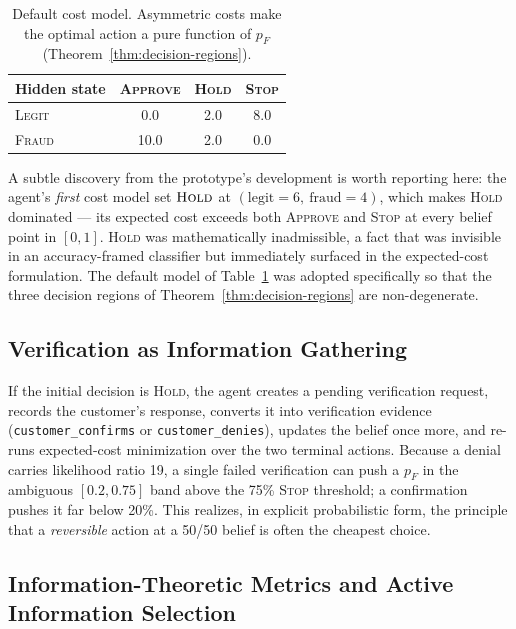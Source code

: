 \documentclass{article}
\begin{document}
\begin{table}[tb]
\centering
\footnotesize
\setlength{\tabcolsep}{4pt}
\begin{tabular}{lccc}
\toprule
Hidden state & \textsc{Approve} & \textsc{Hold} & \textsc{Stop} \\
\midrule
\textsc{Legit}  & 0.0 & 2.0 & 8.0 \\
\textsc{Fraud}  & 10.0 & 2.0 & 0.0 \\
\bottomrule
\end{tabular}
\caption{Default cost model. Asymmetric costs make the optimal action a pure
function of $p_F$ (Theorem~\ref{thm:decision-regions}).}
\label{tab:costs}
\end{table}

A subtle discovery from the prototype's development is worth reporting here:
the agent's \emph{first} cost model set $\textsc{Hold}$ at
$(\text{legit}=6,\ \text{fraud}=4)$, which makes \textsc{Hold} dominated --- its
expected cost exceeds both \textsc{Approve} and \textsc{Stop} at every belief
point in $[0,1]$. \textsc{Hold} was mathematically inadmissible, a fact that
was invisible in an accuracy-framed classifier but immediately surfaced in the
expected-cost formulation. The default model of Table~\ref{tab:costs} was
adopted specifically so that the three decision regions of
Theorem~\ref{thm:decision-regions} are non-degenerate.

\subsection{Verification as Information Gathering}

If the initial decision is \textsc{Hold}, the agent creates a pending
verification request, records the customer's response, converts it into
verification evidence (\texttt{customer\_confirms} or \texttt{customer\_denies}),
updates the belief once more, and re-runs expected-cost minimization over the
two terminal actions. Because a denial carries likelihood ratio 19, a single
failed verification can push a $p_F$ in the ambiguous $[0.2, 0.75]$ band above
the 75\% \textsc{Stop} threshold; a confirmation pushes it far below 20\%.
This realizes, in explicit probabilistic form, the principle that a
\emph{reversible} action at a 50/50 belief is often the cheapest choice.

\subsection{Information-Theoretic Metrics and Active Information Selection}
\end{document}
